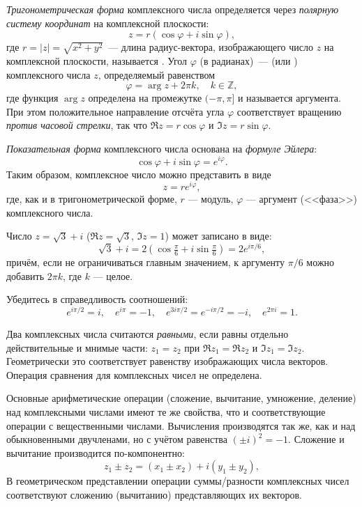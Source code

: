 \begin{labsupplement}
    \emph{Тригонометрическая форма} комплексного числа определяется через
    \emph{полярную систему координат} на комплексной плоскости:
    \[
        z = r\left(\cos\varphi + i\sin\varphi\right),
    \]
где $r = \left| z \right| = \sqrt{x^{2} + y^{2}}$~--- длина
    радиус-вектора, изображающего число $z$ на комплексной плоскости,
    называется . Угол $\varphi$ (в радианах)~---
     (или ) комплексного числа $z$, определяемый равенством
    \[
        \varphi = \arg z + 2 \pi k,\quad k \in \mathbb{Z},
    \]
    где функция $\arg z$ определена на промежутке $(-\pi,\pi]$
    и называется  аргумента.
    При этом положительное направление отсчёта угла $\varphi$
    соответствует вращению \emph{против часовой стрелки}, так что
    $\Re z = r\cos\varphi$ и $\Im z = r\sin\varphi$.

    \emph{Показательная форма} комплексного числа основана на \emph{формуле
    Эйлера}:
    \[
\cos \varphi + i \sin \varphi = e^{i\varphi}.
    \]
    Таким образом, комплексное число можно представить в виде
    \[
    z = re^{i\varphi},
    \]
    где, как и в тригонометрической форме, $r$ --- модуль, $\varphi$ ---
    аргумент (<<фаза>>) комплексного числа.

    \begin{lab:example}
    Число $z=\sqrt{3} + i$ ($\Re z = \sqrt{3}$, $\Im z = 1$) может записано в виде:
    \[
        \sqrt{3} + i = 2\left(\cos\tfrac{\pi}{6} + i\sin\tfrac{\pi}{6}\right) =
        2e^{i\pi/6},
    \]
    причём, если не ограничиваться главным значением,
    к аргументу $\pi/6$ можно добавить $2\pi k$, где $k$ --- целое.
    \end{lab:example}

    \begin{lab:exercise}
     Убедитесь в справедливость соотношений:
     \[
      e^{i\pi/2} = i,\quad e^{i\pi} = -1,\quad e^{3i\pi/2} = e^{-i\pi/2} =-i,\quad
      e^{2\pi i} = 1.
     \]
    \end{lab:exercise}

    Два комплексных числа считаются
    \emph{равными}, если равны отдельно действительные и мнимые части:
    $z_1 = z_2$ при $\Re z_1=\Re z_2$ и $\Im z_1=\Im z_2$. Геометрически
    это соответствует равенству изображающих числа векторов.
    Операция сравнения для комплексных чисел не определена.




    Основные арифметические операции (сложение, вычитание, умножение, деление)
    над комплексными числами имеют те же свойства, что и соответствующие операции с вещественными числами.
    Вычисления производятся так же, как и над обыкновенными двучленами,
    но с учётом равенства $(\pm i)^{2} = - 1$.
    Сложение и вычитание производится по-компонентно:
    \[
     z_1 \pm z_2 = (x_1 \pm x_2) + i (y_1 \pm y_2),
    \]
    В геометрическом представлении операции суммы/разности комплексных чисел соответствуют
    сложению (вычитанию) представляющих их векторов.


\end{labsupplement}
